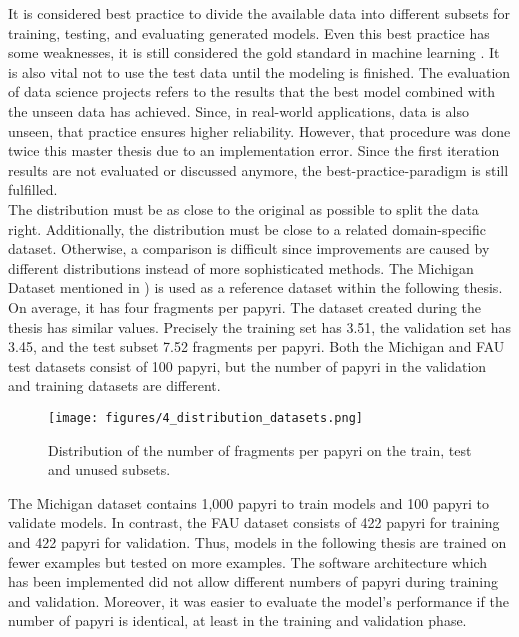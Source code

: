 It is considered best practice to divide the available data into different subsets for training, testing, and evaluating generated models. Even this best practice has some weaknesses, it is still considered the gold standard in machine learning \cite{Tan21}. It is also vital not to use the test data until the modeling is finished. The evaluation of data science projects refers to the results that the best model combined with the unseen data has achieved. Since, in real-world applications, data is also unseen, that practice ensures higher reliability. However, that procedure was done twice this master thesis due to an implementation error. Since the first iteration results are not evaluated or discussed anymore, the best-practice-paradigm is still fulfilled.\\

\noindent The distribution must be as close to the original as possible to split the data right. Additionally, the distribution must be close to a related domain-specific dataset. Otherwise, a comparison is difficult since improvements are caused by different distributions instead of more sophisticated methods. The Michigan Dataset mentioned in ) is used as a reference dataset within the following thesis. On average, it has four fragments per papyri. The dataset created during the thesis has similar values. Precisely the training set has 3.51, the validation set has 3.45, and the test subset 7.52 fragments per papyri. Both the Michigan and FAU test datasets consist of 100 papyri, but the number of papyri in the validation and training datasets are different.\\ 

\begin{figure}[t]
	\texttt{[image: figures/4\_distribution\_datasets.png]}
	\caption{Distribution of the number of fragments per papyri on the train, test and unused subsets.}
	\label{fig:HistogramTrainTestValSplit}
\end{figure}

\noindent The Michigan dataset contains 1,000 papyri to train models and 100 papyri to validate models. In contrast, the FAU dataset consists of  422 papyri for training and 422 papyri for validation. Thus, models in the following thesis are trained on fewer examples but tested on more examples. The software architecture which has been implemented did not allow different numbers of papyri during training and validation. Moreover, it was easier to evaluate the model's performance if the number of papyri is identical, at least in the training and validation phase. \\

